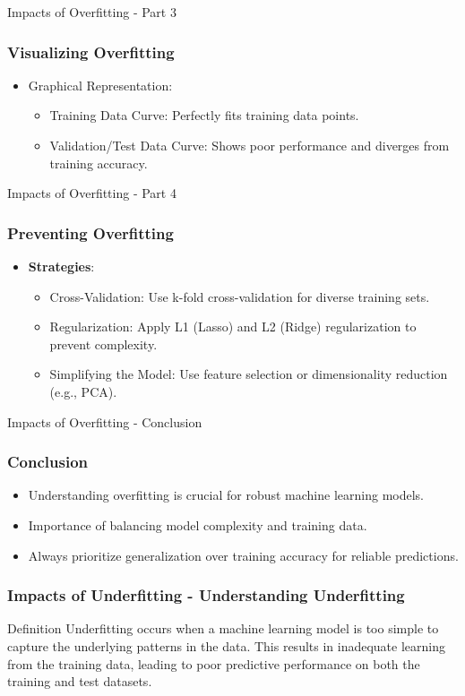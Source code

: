 \documentclass[aspectratio=169]{beamer}
\begin{document}
\begin{frame}[fragile]{Impacts of Overfitting - Part 3}
    \frametitle{Visualizing Overfitting}
    \begin{itemize}
        \item Graphical Representation:
            \begin{itemize}
                \item Training Data Curve: Perfectly fits training data points.
                \item Validation/Test Data Curve: Shows poor performance and diverges from training accuracy.
            \end{itemize}
    \end{itemize}
\end{frame}

\begin{frame}[fragile]{Impacts of Overfitting - Part 4}
    \frametitle{Preventing Overfitting}
    \begin{itemize}
        \item \textbf{Strategies}:
            \begin{itemize}
                \item Cross-Validation: Use k-fold cross-validation for diverse training sets.
                \item Regularization: Apply L1 (Lasso) and L2 (Ridge) regularization to prevent complexity.
                \item Simplifying the Model: Use feature selection or dimensionality reduction (e.g., PCA).
            \end{itemize}
    \end{itemize}
\end{frame}

\begin{frame}[fragile]{Impacts of Overfitting - Conclusion}
    \frametitle{Conclusion}
    \begin{itemize}
        \item Understanding overfitting is crucial for robust machine learning models.
        \item Importance of balancing model complexity and training data.
        \item Always prioritize generalization over training accuracy for reliable predictions.
    \end{itemize}
\end{frame}

\begin{frame}[fragile]
    \frametitle{Impacts of Underfitting - Understanding Underfitting}
    \begin{block}{Definition}
        Underfitting occurs when a machine learning model is too simple to capture the underlying patterns in the data. This results in inadequate learning from the training data, leading to poor predictive performance on both the training and test datasets.
    \end{block}
\end{frame}
\end{document}
